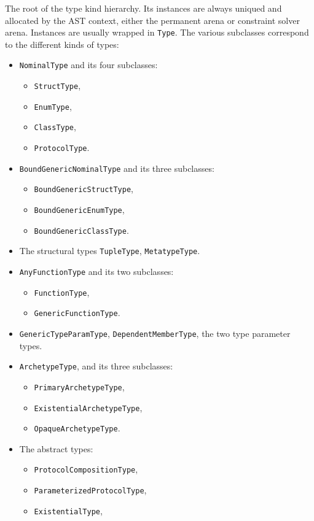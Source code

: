 \documentclass[../generics]{subfiles}
\begin{document}
The root of the type kind hierarchy. Its instances are always uniqued and allocated by the AST context, either the permanent arena or constraint solver arena. Instances are usually wrapped in \texttt{Type}. The various subclasses correspond to the different kinds of types:
\begin{itemize}
\item \texttt{NominalType} and its four subclasses:
\begin{itemize}
\item \texttt{StructType},
\item \texttt{EnumType},
\item \texttt{ClassType},
\item \texttt{ProtocolType}.
\end{itemize}
\item \texttt{BoundGenericNominalType} and its three subclasses:
\begin{itemize}
\item \texttt{BoundGenericStructType},
\item \texttt{BoundGenericEnumType},
\item \texttt{BoundGenericClassType}.
\end{itemize}
\item The structural types \texttt{TupleType}, \texttt{MetatypeType}.
\item \texttt{AnyFunctionType} and its two subclasses:
\begin{itemize}
\item \texttt{FunctionType},
\item \texttt{GenericFunctionType}.
\end{itemize}
\item \texttt{GenericTypeParamType}, \texttt{DependentMemberType}, the two type parameter types.
\item \texttt{ArchetypeType}, and its three subclasses:
\begin{itemize}
\item \texttt{PrimaryArchetypeType},
\item \texttt{ExistentialArchetypeType},
\item \texttt{OpaqueArchetypeType}.
\end{itemize}
\item The abstract types:
\begin{itemize}
\item \texttt{ProtocolCompositionType},
\item \texttt{ParameterizedProtocolType},
\item \texttt{ExistentialType},

\end{itemize}
\end{itemize}
\end{document}
